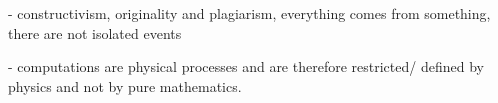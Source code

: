 - constructivism, originality and plagiarism, everything comes from something, there are not isolated events

- computations are physical processes and are therefore restricted/ defined by physics and not by pure mathematics.








